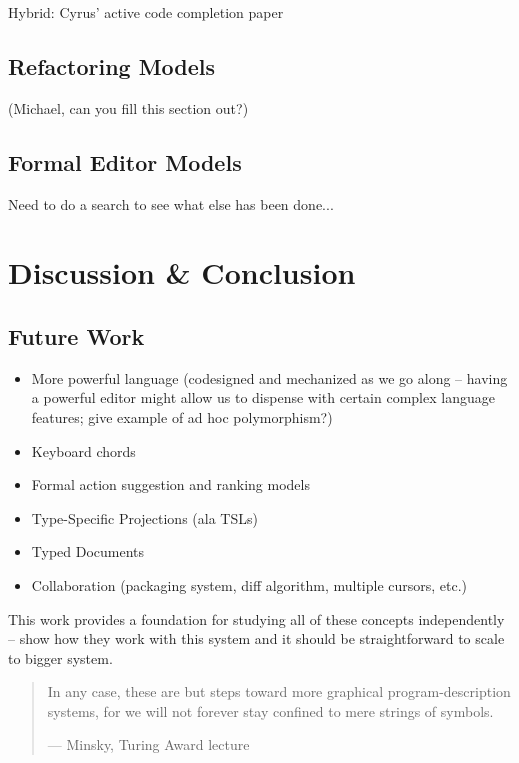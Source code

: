 \documentclass{llncs}
\begin{document}
Hybrid: Cyrus' active code completion paper

\subsection{Refactoring Models}
(Michael, can you fill this section out?)

\subsection{Formal Editor Models}
Need to do a search to see what else has been done...

\section{Discussion \& Conclusion}
\subsection{Future Work}
\begin{itemize}
\item More powerful language (codesigned and mechanized as we go along -- having a powerful editor might allow us to dispense with certain complex language features; give example of ad hoc polymorphism?)
\item Keyboard chords
\item Formal action suggestion and ranking models
\item Type-Specific Projections (ala TSLs)
\item Typed Documents
\item Collaboration (packaging system, diff algorithm, multiple cursors, etc.)
\end{itemize}

This work provides a foundation for studying all of these concepts independently -- show how they work with this system and it should be straightforward to scale to bigger system.

\begin{quote}
In any case, these are but steps toward more graphical program-description systems, for we will not forever stay confined to mere strings of symbols. 

--- Minsky, Turing Award lecture 
\end{quote}

%
%
%
\end{document}
